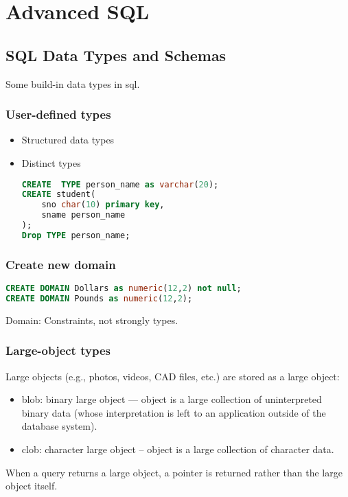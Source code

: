 \newpage
\section{Advanced SQL}

\subsection{SQL Data Types and Schemas}
Some build-in data types in sql. 

\subsubsection{User-defined types}
\begin{itemize}
    \item Structured data types
    \item Distinct types
    \begin{lstlisting}[language=sql]
CREATE  TYPE person_name as varchar(20);
CREATE student(
    sno char(10) primary key,
    sname person_name
);
Drop TYPE person_name;
    \end{lstlisting}
\end{itemize}

\subsubsection{Create new domain}
\begin{lstlisting}[language=sql]
CREATE DOMAIN Dollars as numeric(12,2) not null;
CREATE DOMAIN Pounds as numeric(12,2);
\end{lstlisting}

Domain: Constraints, not strongly types. 

\subsubsection{Large-object types}

Large objects (e.g., photos, videos, CAD files, etc.) are stored as a large object: 
\begin{itemize}
    \item blob: binary large object --- object is a large collection of uninterpreted binary data (whose interpretation is left to an application outside of the database system). 
    \item clob: character large object -- object is a large collection of character data. 
\end{itemize}
When a query returns a large object, a pointer is returned rather than the large object itself.

